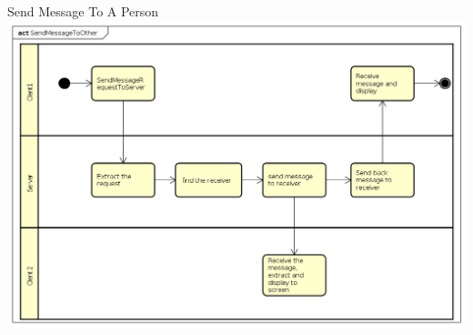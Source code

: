 \documentclass{beamer}
\begin{document}
\begin{frame}{Send Message To A Person}
\includegraphics[scale=0.3]{SendMessageToOther.png}
\end{frame}
\end{document}
